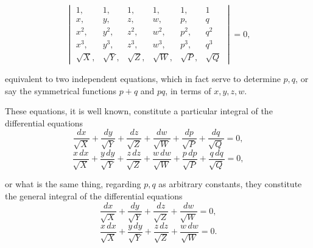 \documentclass[11pt]{article}
\begin{document}
\[
\begin{vmatrix}
1, & 1, & 1, & 1, & 1, & 1 \\
x, & y, & z, & w, & p, & q \\
x^2, & y^2, & z^2, & w^2, & p^2, & q^2 \\
x^3, & y^3, & z^3, & w^3, & p^3, & q^3 \\
\sqrt{X}, & \sqrt{Y}, & \sqrt{Z}, & \sqrt{W}, & \sqrt{P}, & \sqrt{Q}
\end{vmatrix} = 0,
\]

equivalent to two independent equations, which in fact serve to determine $p, q$, or say the symmetrical functions $p + q$ and $pq$, in terms of $x, y, z, w$.

These equations, it is well known, constitute a particular integral of the differential equations
\[
\frac{dx}{\sqrt{X}} + \frac{dy}{\sqrt{Y}} + \frac{dz}{\sqrt{Z}} + \frac{dw}{\sqrt{W}} + \frac{dp}{\sqrt{P}} + \frac{dq}{\sqrt{Q}} = 0,
\]
\[
\frac{x\,dx}{\sqrt{X}} + \frac{y\,dy}{\sqrt{Y}} + \frac{z\,dz}{\sqrt{Z}} + \frac{w\,dw}{\sqrt{W}} + \frac{p\,dp}{\sqrt{P}} + \frac{q\,dq}{\sqrt{Q}} = 0,
\]

or what is the same thing, regarding $p, q$ as arbitrary constants, they constitute the general integral of the differential equations
\[
\frac{dx}{\sqrt{X}} + \frac{dy}{\sqrt{Y}} + \frac{dz}{\sqrt{Z}} + \frac{dw}{\sqrt{W}} = 0,
\]
\[
\frac{x\,dx}{\sqrt{X}} + \frac{y\,dy}{\sqrt{Y}} + \frac{z\,dz}{\sqrt{Z}} + \frac{w\,dw}{\sqrt{W}} = 0.
\]
\end{document}
